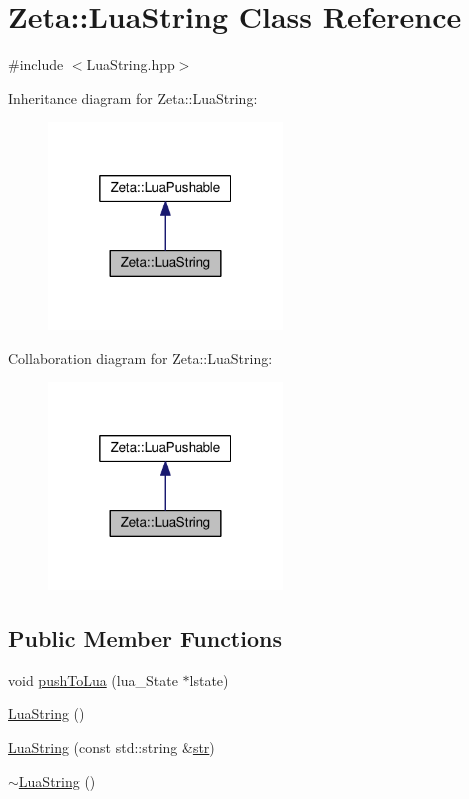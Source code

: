 \hypertarget{classZeta_1_1LuaString}{\section{Zeta\+:\+:Lua\+String Class Reference}
\label{classZeta_1_1LuaString}
}


{\ttfamily \#include $<$Lua\+String.\+hpp$>$}



Inheritance diagram for Zeta\+:\+:Lua\+String\+:\nopagebreak
\begin{figure}[H]
\begin{center}
\leavevmode
\includegraphics[width=176pt]{classZeta_1_1LuaString__inherit__graph}
\end{center}
\end{figure}


Collaboration diagram for Zeta\+:\+:Lua\+String\+:\nopagebreak
\begin{figure}[H]
\begin{center}
\leavevmode
\includegraphics[width=176pt]{classZeta_1_1LuaString__coll__graph}
\end{center}
\end{figure}
\subsection*{Public Member Functions}
\begin{DoxyCompactItemize}
\item 
void \hyperlink{classZeta_1_1LuaString_a769f02cc816861d8f3a694ebe4ff330a}{push\+To\+Lua} (lua\+\_\+\+State $\ast$lstate)
\item 
\hyperlink{classZeta_1_1LuaString_aee0b5b994d9d427ff18b4c51db10302b}{Lua\+String} ()
\item 
\hyperlink{classZeta_1_1LuaString_a9b8ba1a341b5252d124a17161246aac8}{Lua\+String} (const std\+::string \&\hyperlink{classZeta_1_1LuaString_a80a19e5adfd90bc98ae80740edb99e5b}{str})
\item 
\hyperlink{classZeta_1_1LuaString_aeb0dcc41286ff70bbb098e0c61ecf747}{$\sim$\+Lua\+String} ()
\end{DoxyCompactItemize}
